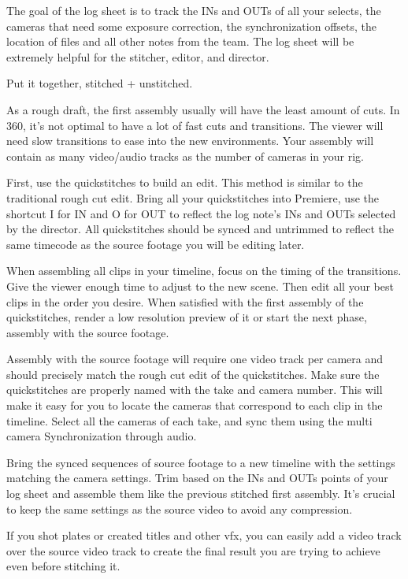 \begin{fullwidth}
The goal of the log sheet is to track the INs and OUTs of all your selects, the cameras that need some exposure correction, the synchronization offsets, the location of files and all other notes from the team. The log sheet will be extremely helpful for the stitcher, editor, and director.

{\large Put it together, stitched + unstitched. \par}

As a rough draft, the first assembly usually will have the least amount of cuts. In 360, it’s not optimal to have a lot of fast cuts and transitions. The viewer will need slow transitions to ease into the new environments. Your assembly will contain as many video/audio tracks as the number of cameras in your rig. 

First, use the quickstitches to build an edit. This method is similar to the traditional rough cut edit. Bring all your quickstitches into Premiere, use the shortcut I for IN and O for OUT to reflect the log note’s INs and OUTs selected by the director. All quickstitches should be synced and untrimmed to reflect the same timecode as the source footage you will be editing later.

When assembling all clips in your timeline, focus on the timing of the transitions. Give the viewer enough time to adjust to the new scene. Then edit all your best clips in the order you desire. 
When satisfied with the first assembly of the quickstitches, render a low resolution preview of it or start the next phase, assembly with the source footage.


Assembly with the source footage will require one video track per camera and should precisely match the rough cut edit of the quickstitches. Make sure the quickstitches are properly named with the take and camera number. This will make it easy for you to locate the cameras that correspond to each clip in the timeline. Select all the cameras of each take, and sync them using the multi camera Synchronization through audio.

Bring the synced sequences of source footage to a new timeline with the settings matching the camera settings. Trim based on the INs and OUTs points of your log sheet and assemble them like the previous stitched first assembly. It’s crucial to keep the same settings as the source video to avoid any compression. 

If you shot plates or created titles and other vfx, you can easily add a video track over the source video track to create the final result you are trying to achieve even before stitching it.


\end{fullwidth}
